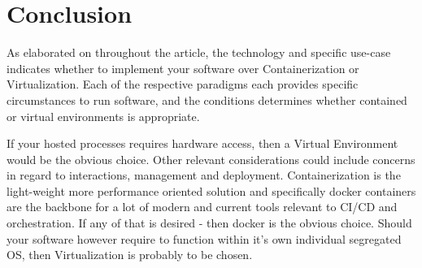 \documentclass[a4paper,10pt]{article}
\begin{document}
	
	\section{Conclusion}
	As elaborated on throughout the article, the technology and specific use-case indicates whether to implement your software over Containerization or Virtualization. Each of the respective paradigms each provides specific circumstances to run software, and the conditions determines whether contained or virtual environments is appropriate. 
	
	If your hosted processes requires hardware access, then a Virtual Environment would be the obvious choice. Other relevant considerations could include concerns in regard to interactions, management and deployment. Containerization is the light-weight more performance oriented solution and specifically docker containers are the backbone for a lot of modern and current tools relevant to CI/CD and orchestration. If any of that is desired - then docker is the obvious choice. Should your software however require to function within it's own individual segregated OS, then Virtualization is probably to be chosen.
	
		
	
\end{document}
